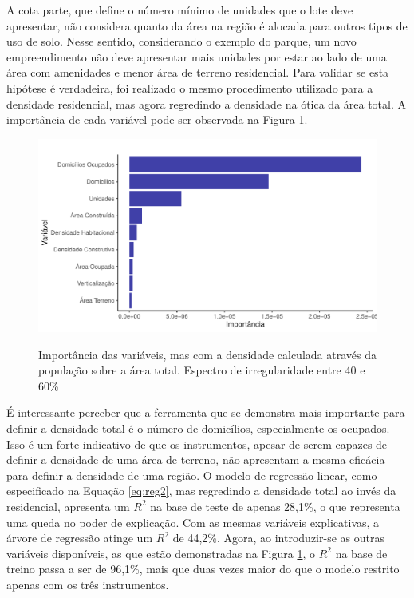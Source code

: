 A cota parte, que define o número mínimo de unidades que o lote deve apresentar, não considera quanto da área na região é alocada para outros tipos de uso de solo. Nesse sentido, considerando o exemplo do parque, um novo empreendimento não deve apresentar mais unidades por estar ao lado de uma área com amenidades e menor área de terreno residencial. Para validar se esta hipótese é verdadeira, foi realizado o mesmo procedimento utilizado para a densidade residencial, mas agora regredindo a densidade na ótica da área total. A importância de cada variável pode ser observada na Figura \ref{fig:importancia_densmod}.

\begin{figure}[h]
    \centering
    \caption{Importância das variáveis, mas com a densidade calculada através da população sobre a área total. Espectro de irregularidade entre 40 e 60\%}
    \includegraphics[width = .95\linewidth]{imagens/var_importance_densmod.pdf}
    \label{fig:importancia_densmod}
\end{figure}

É interessante perceber que a ferramenta que se demonstra mais importante para definir a densidade total é o número de domicílios, especialmente os ocupados. Isso é um forte indicativo de que os instrumentos, apesar de serem capazes de definir a densidade de uma área de terreno, não apresentam a mesma eficácia para definir a densidade de uma região. O modelo de regressão linear, como especificado na Equação \ref{eq:reg2}, mas regredindo a densidade total ao invés da residencial, apresenta um $R^2$ na base de teste de apenas 28,1\%, o que representa uma queda no poder de explicação. Com as mesmas variáveis explicativas, a árvore de regressão atinge um $R^2$ de 44,2\%. Agora, ao introduzir-se as outras variáveis disponíveis, as que estão demonstradas na Figura \ref{fig:importancia_densmod}, o $R^2$ na base de treino passa a ser de 96,1\%, mais que duas vezes maior do que o modelo restrito apenas com os três instrumentos. 

